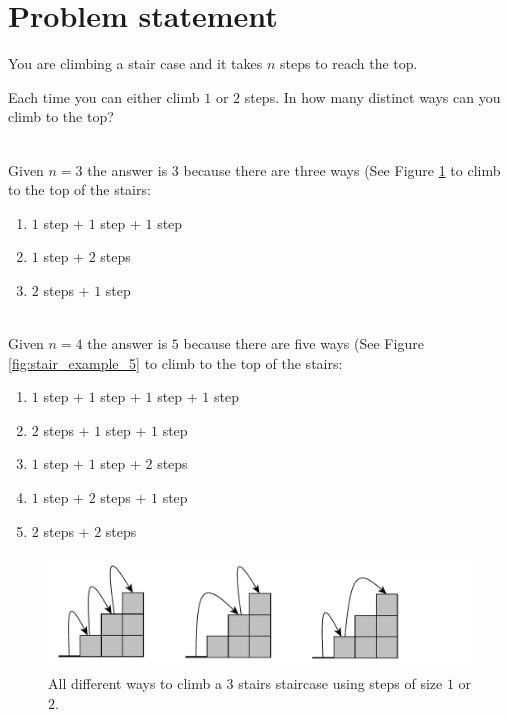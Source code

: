 \section{Problem statement}
\label{sec:stairs_climbing_statement_easy}
\begin{exercise}
You are climbing a stair case and it takes $n$ steps to reach the top.

Each time you can either climb $1$ or $2$ steps. In how many distinct ways can you climb to the top?


\begin{example}
	\hfill \\ 
	Given $n = 3$ the answer is $3$ because there are three ways (See Figure \ref{fig:stair_example_3} to climb to the top of the stairs:
	\begin{enumerate}
		\item $1$ step + $1$ step + $1$ step
		\item $1$ step + $2$ steps
		\item $2$ steps + $1$ step
	\end{enumerate}
	

	
\end{example}

\begin{example}
	\hfill \\
	Given $n = 4$ the answer is $5$ because there are five ways (See Figure \ref{fig:stair_example_5} to climb to the top of the stairs:
	\begin{enumerate}
		\item $1$ step + $1$ step + $1$ step + $1$ step
		\item $2$ steps + $1$ step + $1$ step
		\item $1$ step + $1$ step + $2$ steps 
		\item $1$ step + $2$ steps + $1$ step
		\item $2$ steps +  $2$ steps
	\end{enumerate}
	
	
\end{example}
\end{exercise}

\begin{figure}
	\centering
	\includegraphics[width=\textwidth]{sources/stairs_climbing/images/stairs3}
	\caption{All different ways to climb a 3 stairs staircase using steps of size $1$ or $2$.}
	\label{fig:stair_example_3}
\end{figure}

